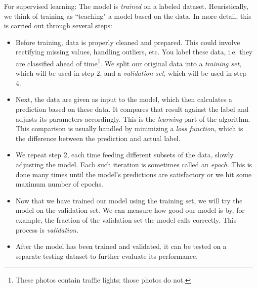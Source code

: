 For supervised learning: The model is {\it trained} 
on a labeled dataset. 
Heuristically, we think of training as ``teaching" a model based on the
data. In more detail, this is carried out through several steps:
\begin{itemize}
\item Before training, data is properly cleaned and prepared. This could 
involve rectifying missing values, handling outliers, etc. You label
these data, i.e. they are classified ahead of time\footnote{These photos
contain traffic lights; those photos do not.}. We split our original
data into a {\it training set}, which will be used in step 2, and
a {\it validation set}, which will be used in step 4.
\item Next, the data are given as input to the model, which then calculates
a prediction based on these data. It compares that result against the label
and adjusts its parameters accordingly. This is the {\it
learning} part of the algorithm. This comparison is usually
handled by minimizing a {\it loss function}, which
is the difference between the prediction and actual label.
\item We repeat step 2, each time feeding different subsets of the data, 
slowly adjusting the model. Each such iteration is sometimes called
an {\it epoch}. This is done many times until the model's 
predictions are satisfactory or we hit some maximum number of epochs. 
\item Now that we have trained our model using the training set, we will
try the model on the validation set. We can measure how good our model
is by, for example, the fraction of the validation set the model calls
correctly. This process is {\it validation}.
\item After the model has been trained and validated, it can be tested on a separate testing dataset to further evaluate its performance.
\end{itemize}


%
%


